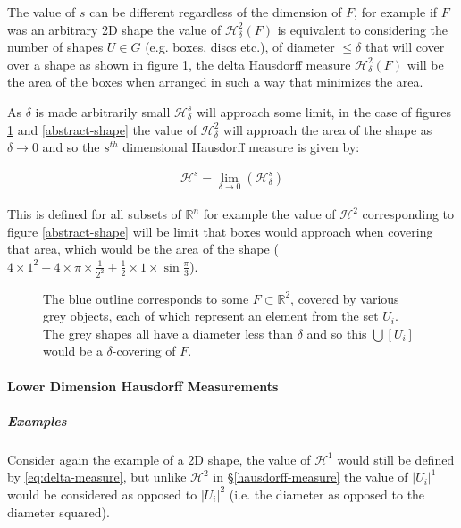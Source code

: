 \documentclass[a4paper,11pt,twoside]{article}
\begin{document}
The value of \(s\) can be different regardless of the dimension of \(F\), for example if \(F\) was an arbitrary 2D shape the value of \(\mathcal{H}_{\delta}^{2}\left(F\right)\)
is equivalent to considering the number of shapes \(U\in G\) (e.g. boxes, discs etc.), of
diameter \(\leq \delta\) that will cover over a shape as shown in figure
\ref{hausdorff-covering}, the delta Hausdorff measure
\(\mathcal{H}^{2}_{\delta} \left(F\right)\) will be the area of the boxes when
arranged in such a way that minimizes the area.

As \(\delta\) is made arbitrarily small \(\mathcal{H}_{\delta}^{s}\) will approach some limit, in the case of figures \ref{hausdorff-covering}  and \ref{abstract-shape} the value of \(\mathcal{H}^{2}_{\delta}\) will approach the area of the shape as \(\delta \rightarrow 0\) and so the \(s^{th}\) dimensional Hausdorff measure is given by:

\begin{align}
\mathcal{H}^{s} = \lim_{\delta \rightarrow 0}\left( \mathcal{H}^{s}_{\delta} \right) \label{eq:limit-haus}
\end{align}

This is defined for all subsets of \(\mathbb{R}^n\) for example the value of  \(\mathcal{H}^{2}\) corresponding to figure \ref{abstract-shape} will be limit that boxes would approach when covering that area, which would be the area of the shape (\(4\times 1^2 + 4\times \pi\times \frac{1}{2^2} + \frac{1}{2}\times 1 \times \sin{\frac{\pi}{3}}\)).





\begin{figure}
\centering

\caption{\label{hausdorff-covering}The blue outline corresponds to some \(F \subset \mathbb{R}^{2}\), covered by various grey objects, each of which represent an element from the set \(U_{i}\). The grey shapes all have a diameter less than \(\delta\) and so this  \(\bigcup \left[U_{i}\right]\) would be a \(\delta\)-covering of \(F\).}
\end{figure}




\paragraph{Lower Dimension Hausdorff Measurements}
\label{sec:org35ea974}
\subparagraph{Examples}
\label{sec:org807b101}
Consider again the example of a 2D shape, the value of \(\mathcal{H}^{1}\) would still be defined by \eqref{eq:delta-measure}, but unlike \(\mathcal{H}^{2}\) in \S \ref{hausdorff-measure} the value of \(\left\lvert U_i \right\rvert^1\) would be considered as opposed to \(\left\lvert U_i \right\rvert^2\) (i.e. the diameter as opposed to the diameter squared).
\end{document}
